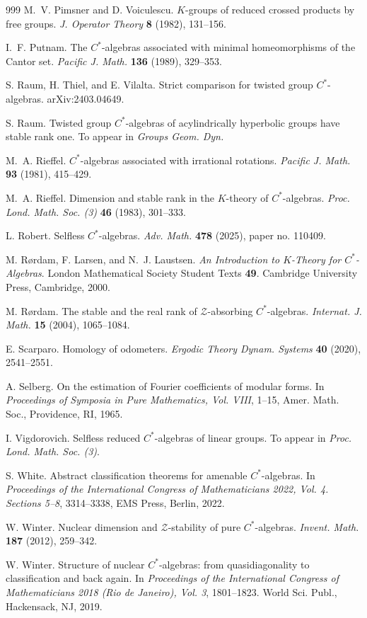 \documentclass[11pt,a4,leqno]{amsart}
\theoremstyle{definition}
\theoremstyle{remark}
\numberwithin{equation}{section}
\theoremstyle{plain}
\begin{document}
\begin{thebibliography}{999}
M.~V. Pimsner and D. Voiculescu.
$K$-groups of reduced crossed products by free groups.
{\it J. Operator Theory} {\bf 8} (1982), 131--156.

I.~F. Putnam.
The $C^*$-algebras associated with minimal homeomorphisms of the Cantor set.
{\it Pacific J. Math.} {\bf 136} (1989), 329--353.

S. Raum, H. Thiel, and E. Vilalta.
Strict comparison for twisted group $C^*$-algebras.
arXiv:2403.04649. 

S. Raum. 
Twisted group $C^*$-algebras of acylindrically hyperbolic groups have stable rank one. 
To appear in {\it Groups Geom. Dyn.}

M.~A. Rieffel.
$C^*$-algebras associated with irrational rotations.
{\it Pacific J. Math.} {\bf 93} (1981), 415--429. 

M.~A. Rieffel.
Dimension and stable rank in the $K$-theory of $C^*$-algebras.
{\it Proc. Lond. Math. Soc. (3)} {\bf 46} (1983), 301--333.

L. Robert.
Selfless $C^*$-algebras.
{\it Adv. Math.} {\bf 478} (2025), paper no. 110409.

M. Rørdam, F. Larsen, and N.~J. Laustsen.
{\it An Introduction to $K$-Theory for $C^*$-Algebras}.
London Mathematical Society Student Texts {\bf 49}.
Cambridge University Press, Cambridge, 2000.

M. R{\o}rdam.
The stable and the real rank of $\mathcal{Z}$-absorbing $C^*$-algebras.
{\it Internat. J. Math.} {\bf 15} (2004), 1065--1084.

E. Scarparo.
Homology of odometers.
{\it Ergodic Theory Dynam. Systems} {\bf 40} (2020), 2541--2551.

A. Selberg.
On the estimation of Fourier coefficients of modular forms.
In {\it Proceedings of Symposia in Pure Mathematics, Vol. VIII}, 1--15, Amer. Math. Soc., Providence, RI, 1965.

I. Vigdorovich.
Selfless reduced $C^*$-algebras of linear groups.
To appear in {\it Proc. Lond. Math. Soc. (3)}. 

S. White.
Abstract classification theorems for amenable $C^*$-algebras.
In {\it Proceedings of the International Congress of Mathematicians 2022, Vol. 4. Sections 5--8}, 3314--3338, EMS Press, Berlin, 2022. 

W. Winter.
Nuclear dimension and $\mathcal{Z}$-stability of pure $C^*$-algebras.
{\it Invent. Math.} {\bf 187} (2012), 259--342. 

W. Winter.
Structure of nuclear $C^*$-algebras: from quasidiagonality to classification and back again.
In {\it Proceedings of the International Congress of Mathematicians 2018 (Rio de Janeiro), Vol. 3}, 1801--1823. World Sci. Publ., Hackensack, NJ, 2019. 

\end{thebibliography}
\end{document}

